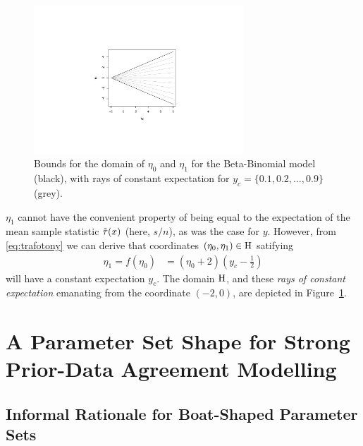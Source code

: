 \begin{figure}  %
\centering
\includegraphics[trim = 80mm 45mm 80mm 60mm, clip, width=0.7\textwidth]{R/boatshape-domain}%
\caption[Bounds for the domain of $\eta_0$ and $\eta_1$ for the Beta-Binomial model,
with rays of constant expectation for $y_c = \{0.1,0.2,\ldots,0.9\}$.]%
{Bounds for the domain of $\eta_0$ and $\eta_1$ for the Beta-Binomial model (black),
with rays of constant expectation for $y_c = \{0.1,0.2,\ldots,0.9\}$ (grey).}
\label{fig:boatshape-domain}
\end{figure}

$\eta_1$ cannot have the convenient property of being equal to
the expectation of the mean sample statistic $\tilde{\tau}(x)$ (here, $s/n$),
as was the case for $y$.
However, from \eqref{eq:trafotony} we can derive that coordinates $(\eta_0,\eta_1) \in \mathrm{H}$ satifying
\begin{align}
\label{eq:raysofconstantexpectation}
\eta_1 = f(\eta_0) &= (\eta_0 + 2)(y_c - \frac{1}{2}) 
\end{align}
will have a constant expectation $y_c$.
The domain $\mathrm{H}$, and these \emph{rays of constant expectation} emanating from the coordinate $(-2,0)$,
are depicted in Figure~\ref{fig:boatshape-domain}.


\section{A Parameter Set Shape for Strong Prior-Data Agreement Modelling}

\subsection{Informal Rationale for Boat-Shaped Parameter Sets}
\label{boatshape-rationale}

